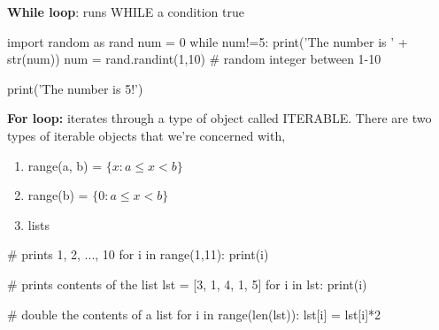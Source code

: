 \documentclass[12pt]{article}
\numberwithin{equation}{section}
\begin{document}
\textbf{While loop}: runs WHILE a condition true
\begin{python}
import random as rand
num = 0
while num!=5:
    print('The number is ' + str(num))
    num = rand.randint(1,10) # random integer between 1-10

print('The number is 5!')
\end{python}

\textbf{For loop:} iterates through a type of object called ITERABLE. There are two types of iterable objects that we're concerned with,
\begin{enumerate}
    \item range(a, b) = $\{x : a\leq x <b\}$
    \item range(b) = $\{0 : a\leq x <b\}$
    \item lists
\end{enumerate}

\begin{python}
# prints 1, 2, ..., 10
for i in range(1,11):
    print(i)

# prints contents of the list
lst = [3, 1, 4, 1, 5]
for i in lst:
    print(i)
    
# double the contents of a list
for i in range(len(lst)):
    lst[i] = lst[i]*2 
\end{python}
\end{document}
